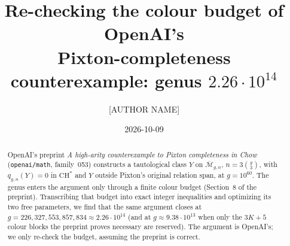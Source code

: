 \documentclass[11pt]{amsart}
\title[The colour budget of OpenAI's Pixton counterexample]{Re-checking the colour budget of OpenAI's\\ Pixton-completeness counterexample: genus $2.26\cdot10^{14}$}
\author{[AUTHOR NAME]}
\date{2026-10-09}
\theoremstyle{remark}
\newcommand{\Mbar}{\overline{\mathcal M}}
\begin{document}
\begin{abstract}\sloppy
OpenAI's preprint \emph{A high-arity counterexample to Pixton completeness in Chow}
(\texttt{openai/math}, family~053) constructs a tautological class $Y$ on $\Mbar_{g,n}$, $n=3\binom g3$,
with $q_{g,n}(Y)=0$ in $\mathrm{CH}^*$ and $Y$ outside Pixton's original relation span, at $g=10^{60}$.
The genus enters the argument only through a finite colour budget (Section~8 of the preprint).
Transcribing that budget into exact integer inequalities and optimizing its two free parameters,
we find that the same argument closes at $g=226{,}327{,}553{,}857{,}834\approx2.26\cdot10^{14}$
(and at $g\approx9.38\cdot10^{13}$ when only the $3K+5$ colour blocks the preprint proves necessary are
reserved). The argument is OpenAI's; we only re-check the budget, assuming the preprint is correct.
\end{abstract}
\maketitle
\end{document}
